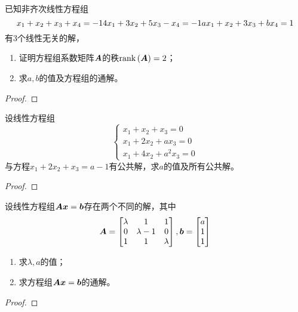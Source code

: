 \begin{problem}\label{problem-2.9}
已知非齐次线性方程组
\begin{equation*}
    x_1+x_2+x_3+x_4=-1\\
    4x_1+3x_2+5x_3-x_4=-1\\
    ax_1+x_2+3x_3+bx_4=1
\end{equation*}
有\(3\)个线性无关的解，
\begin{enumerate}
    \item 证明方程组系数矩阵\(\boldsymbol{A}\)的秩\(\mathrm{rank}\left( \boldsymbol{A} \right)=2\)；
    \item 求\(a,b\)的值及方程组的通解。
\end{enumerate}
\end{problem}
\begin{proof}
\end{proof}

\begin{problem}\label{problem-2.10}
设线性方程组
\begin{equation*}
    \begin{cases}
        x_1+x_2+x_3=0   \\
        x_1+2x_2+ax_3=0 \\
        x_1+4x_2+a^2x_3=0
    \end{cases}
\end{equation*}
与方程\(x_1+2x_2+x_3=a-1\)有公共解，求\(a\)的值及所有公共解。
\end{problem}
\begin{proof}
\end{proof}

\begin{problem}\label{problem-2.11}
设线性方程组\(\boldsymbol{A}\boldsymbol{x}=\boldsymbol{b}\)存在两个不同的解，其中
\begin{equation*}
    \boldsymbol{A}=
    \begin{bmatrix}
        \lambda & 1         & 1       \\
        0       & \lambda-1 & 0       \\
        1       & 1         & \lambda
    \end{bmatrix},
    \boldsymbol{b}=
    \begin{bmatrix}
        a \\1\\1
    \end{bmatrix}
\end{equation*}
\begin{enumerate}
    \item 求\(\lambda,a\)的值；
    \item 求方程组\(\boldsymbol{A}\boldsymbol{x}=\boldsymbol{b}\)的通解。
\end{enumerate}
\end{problem}
\begin{proof}
\end{proof}

